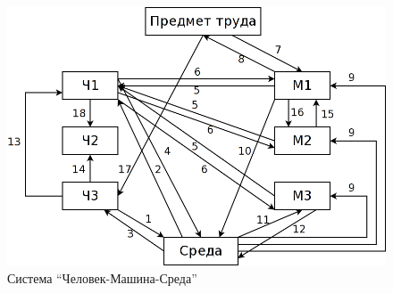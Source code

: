 \begin{figure}[!ht]
    \centering
    \includegraphics[scale=0.4]{graphics/hme.png}
    \caption{Система ``Человек-Машина-Среда''}
    \label{fig:hme}
\end{figure}

